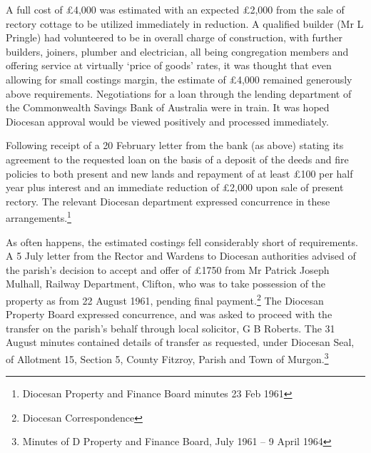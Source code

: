 A full cost of \pounds4,000 was estimated with an expected \pounds2,000 from the sale of rectory cottage to be utilized immediately in reduction. A qualified builder (Mr L Pringle) had volunteered to be in overall charge of construction, with further builders, joiners, plumber and electrician, all being congregation members and offering service at virtually `price of goods' rates, it was thought that even allowing for small costings margin, the estimate of \pounds4,000 remained generously above requirements. Negotiations for a loan through the lending department of the Commonwealth Savings Bank of Australia were in train. It was hoped Diocesan approval would be viewed positively and processed immediately.



Following receipt of a 20 February letter from the bank (as above) stating its agreement to the requested loan on the basis of a deposit of the deeds and fire policies to both present and new lands and repayment of at least \pounds100 per half year plus interest and an immediate reduction of \pounds2,000 upon sale of present rectory. The relevant Diocesan department expressed concurrence in these arrangements.\footnote{Diocesan Property and Finance Board minutes 23 Feb 1961}


As often happens, the estimated costings fell considerably short of requirements. A 5 July letter from the Rector and Wardens to Diocesan authorities advised of the parish's decision to accept and offer of \pounds1750 from Mr Patrick Joseph Mulhall, Railway Department, Clifton, who was to take possession of the property as from 22 August 1961, pending final payment.\footnote{Diocesan Correspondence} The Diocesan Property Board expressed concurrence, and was asked to proceed with the transfer on the parish's behalf through local solicitor, G B Roberts. The 31 August minutes contained details of transfer as requested, under Diocesan Seal, of Allotment 15, Section 5, County Fitzroy, Parish and Town of Murgon.\footnote{Minutes of D Property and Finance Board, July 1961 -- 9 April 1964}


